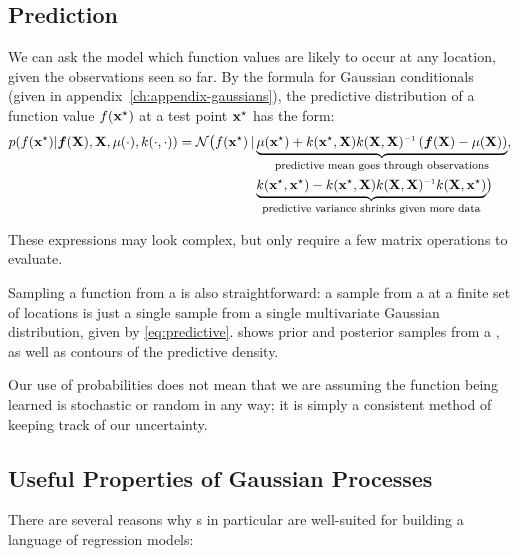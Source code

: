 \subsection{Prediction}
We can ask the model which function values are likely to occur at any location, given the observations seen so far.
By the formula for Gaussian conditionals (given in appendix~\ref{ch:appendix-gaussians}), the predictive distribution of a function value $f({\bf{x}}^\star)$ at a test point ${{\bf{x}}^\star}$ has the form:
%
\begin{align}
p( f(\testpoint) | \funcval, \vX, \mu(\cdot), k(\cdot, \cdot))
 = \mathcal{N} \big( f(\testpoint) \given & \underwrite{\mu(\testpoint) + k(\testpoint, \vX) k(\vX, \vX)\inv \left( \funcval - \mu(\vX) \right) }{\footnotesize predictive mean goes through observations}, \nonumber \\
 & \underwrite{k(\testpoint, \testpoint) - k(\testpoint, \vX) k(\vX, \vX)\inv k(\vX, \testpoint)}{\footnotesize predictive variance shrinks given more data}
 \big)
\label{eq:predictive}
\end{align}

These expressions may look complex, but only require a few matrix operations to evaluate.

Sampling a function from a \gp{} is also straightforward: a sample from a \gp{} at a finite set of locations is just a single sample from a single multivariate Gaussian distribution, given by \cref{eq:predictive}.
 shows prior and posterior samples from a \gp{}, as well as contours of the predictive density.

Our use of probabilities does not mean that we are assuming the function being learned is stochastic or random in any way; it is simply a consistent method of keeping track of our uncertainty.



\subsection{Useful Properties of Gaussian Processes}
\label{sec:useful-properties}

There are several reasons why \gp{}s in particular are well-suited for building a language of regression models:

